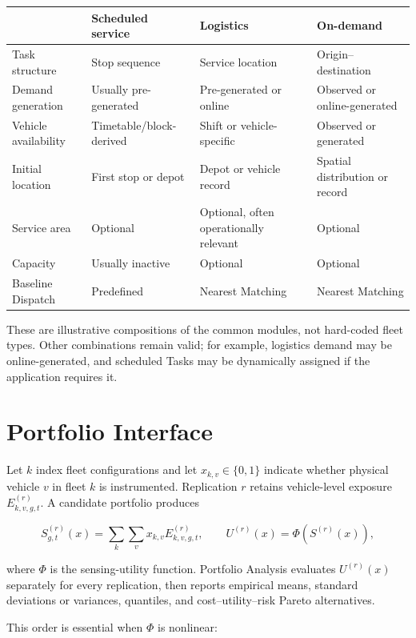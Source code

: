 \documentclass[11pt,a4paper]{article}
\begin{document}
\begin{center}
\scriptsize
\renewcommand{\arraystretch}{1.15}
\begin{tabularx}{\textwidth}{@{}p{3.1cm}YYY@{}}
\toprule
 & \textbf{Scheduled service} & \textbf{Logistics} & \textbf{On-demand} \\
\midrule
Task structure & Stop sequence & Service location & Origin--destination \\
Demand generation & Usually pre-generated & Pre-generated or online & Observed or online-generated \\
Vehicle availability & Timetable/block-derived & Shift or vehicle-specific & Observed or generated \\
Initial location & First stop or depot & Depot or vehicle record & Spatial distribution or record \\
Service area & Optional & Optional, often operationally relevant & Optional \\
Capacity & Usually inactive & Optional & Optional \\
Baseline Dispatch & Predefined & Nearest Matching & Nearest Matching \\
\bottomrule
\end{tabularx}
\end{center}

These are illustrative compositions of the common modules, not hard-coded fleet types. Other combinations remain valid; for example, logistics demand may be online-generated, and scheduled Tasks may be dynamically assigned if the application requires it.

\section{Portfolio Interface}

Let $k$ index fleet configurations and let $x_{k,v}\in\{0,1\}$ indicate whether physical vehicle $v$ in fleet $k$ is instrumented. Replication $r$ retains vehicle-level exposure $E^{(r)}_{k,v,g,t}$. A candidate portfolio produces

\[
S^{(r)}_{g,t}(x)=\sum_k\sum_v x_{k,v}E^{(r)}_{k,v,g,t},
\qquad
U^{(r)}(x)=\Phi\!\left(S^{(r)}(x)\right),
\]

where $\Phi$ is the sensing-utility function. Portfolio Analysis evaluates $U^{(r)}(x)$ separately for every replication, then reports empirical means, standard deviations or variances, quantiles, and cost--utility--risk Pareto alternatives.

This order is essential when $\Phi$ is nonlinear:
\end{document}
